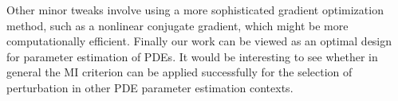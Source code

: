 Other minor tweaks involve using a more sophisticated gradient optimization
method, such as a nonlinear conjugate gradient, which might be more
computationally efficient. Finally our work can be viewed as an optimal design for 
parameter estimation of PDEs. It would be interesting to see whether in general
the MI criterion can be applied successfully for the selection of
perturbation in other PDE parameter estimation contexts. 
 
% 


\clearpage

